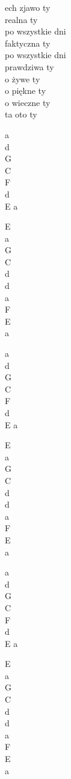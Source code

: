 \begin{text}
    ech zjawo ty\\
    realna ty\\
    po wszystkie dni\\
    faktyczna ty\\
    po wszystkie dni\\
    prawdziwa ty\\
    o żywe ty\\
    o piękne ty\\
    o wieczne ty\\
    ta oto ty 
\end{text}
\begin{chord}
    a\\
    d\\
    G\\
    C\\
    F\\
    d\\
    E a

    E\\
    a\\
    G\\
    C\\
    d\\
    d\\
    a\\
    F\\
    E\\
    a

    a\\
    d\\
    G\\
    C\\
    F\\
    d\\
    E a

    E\\
    a\\
    G\\
    C\\
    d\\
    d\\
    a\\
    F\\
    E\\
    a

    a\\
    d\\
    G\\
    C\\
    F\\
    d\\
    E a

    E\\
    a\\
    G\\
    C\\
    d\\
    d\\
    a\\
    F\\
    E\\
    a
\end{chord}
